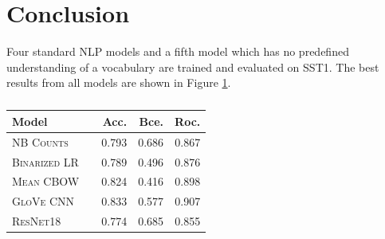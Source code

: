\documentclass[11pt]{article}
\begin{document}
%
%
%
%
%


\section{Conclusion}

Four standard NLP models and a fifth model which has no predefined understanding of a vocabulary are trained and evaluated on SST1. The best results from all models are shown in Figure \ref{tab:conc}.

\begin{table}[h]
\centering
\begin{tabular}{llrrr}
 \toprule
 Model &  & Acc. & Bce. & Roc.\\
 \midrule
 \textsc{NB Counts} & & 0.793  & 0.686 & 0.867\\
 \textsc{Binarized LR} & & 0.789 & 0.496 & 0.876\\
 \textsc{Mean CBOW} & & 0.824 & 0.416 & 0.898\\
 \textsc{GloVe CNN} & & 0.833  & 0.577 & 0.907\\
 \midrule
 \textsc{ResNet18} & & 0.774 & 0.685 & 0.855\\
 \bottomrule
\end{tabular}
\caption{\label{tab:conc} }
\end{table}



\end{document}
